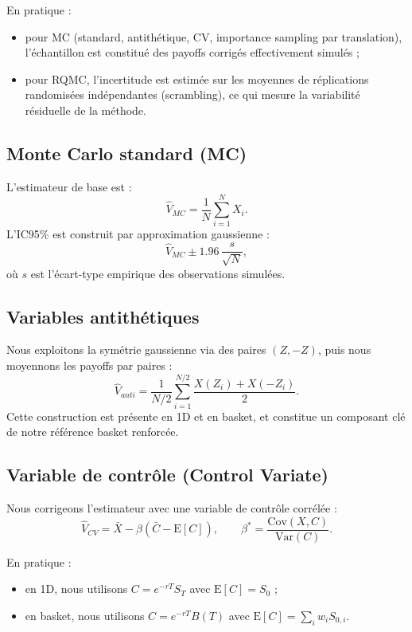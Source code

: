 ﻿\documentclass[11pt,a4paper]{article}
\begin{document}
En pratique :
\begin{itemize}
    \item pour MC (standard, antithétique, CV, importance sampling par translation), l'échantillon est constitué des payoffs corrigés effectivement simulés ;
    \item pour RQMC, l'incertitude est estimée sur les moyennes de réplications randomisées indépendantes (scrambling), ce qui mesure la variabilité résiduelle de la méthode.
\end{itemize}

\subsection{Monte Carlo standard (MC)}

L'estimateur de base est :
\begin{equation}
\hat V_{MC} = \frac{1}{N}\sum_{i=1}^{N} X_i.
\end{equation}
L'IC95\% est construit par approximation gaussienne :
\begin{equation}
\hat V_{MC} \pm 1.96\,\frac{s}{\sqrt{N}},
\end{equation}
où $s$ est l'écart-type empirique des observations simulées.

\subsection{Variables antithétiques}

Nous exploitons la symétrie gaussienne via des paires $(Z,-Z)$, puis nous moyennons les payoffs par paires :
\begin{equation}
\hat V_{anti} = \frac{1}{N/2}\sum_{i=1}^{N/2}\frac{X(Z_i)+X(-Z_i)}{2}.
\end{equation}
Cette construction est présente en 1D et en basket, et constitue un composant clé de notre référence basket renforcée.

\subsection{Variable de contrôle (Control Variate)}

Nous corrigeons l'estimateur avec une variable de contrôle corrélée :
\begin{equation}
\hat V_{CV}=\bar X-\beta(\bar C-\mathrm{E}[C]),
\qquad
\beta^*=\frac{\mathrm{Cov}(X,C)}{\mathrm{Var}(C)}.
\end{equation}

En pratique :
\begin{itemize}
    \item en 1D, nous utilisons $C=e^{-rT}S_T$ avec $\mathrm{E}[C]=S_0$ ;
    \item en basket, nous utilisons $C=e^{-rT}B(T)$ avec $\mathrm{E}[C]=\sum_i w_iS_{0,i}$.
\end{itemize}
\end{document}
